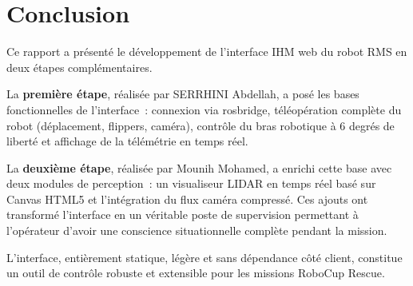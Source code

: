 \documentclass[12pt,a4paper]{report}
\begin{document}
\chapter*{Conclusion}

Ce rapport a présenté le développement de l'interface IHM web du robot RMS en deux étapes complémentaires.

La \textbf{première étape}, réalisée par SERRHINI Abdellah, a posé les bases fonctionnelles de l'interface~: connexion via rosbridge, téléopération complète du robot (déplacement, flippers, caméra), contrôle du bras robotique à 6 degrés de liberté et affichage de la télémétrie en temps réel.

La \textbf{deuxième étape}, réalisée par Mounih Mohamed, a enrichi cette base avec deux modules de perception~: un visualiseur LIDAR en temps réel basé sur Canvas HTML5 et l'intégration du flux caméra compressé. Ces ajouts ont transformé l'interface en un véritable poste de supervision permettant à l'opérateur d'avoir une conscience situationnelle complète pendant la mission.

L'interface, entièrement statique, légère et sans dépendance côté client, constitue un outil de contrôle robuste et extensible pour les missions RoboCup Rescue.
\end{document}
